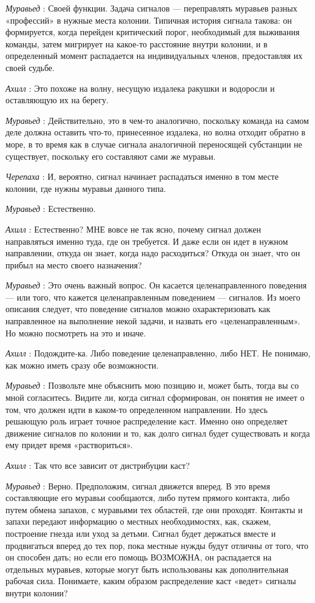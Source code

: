 \documentclass[../main.tex]{subfiles}
\begin{document}
\begin{dialogue}
\emph{Муравьед} : Своей функции. Задача сигналов --- переправлять муравьев разных «профессий» в нужные места колонии. Типичная история сигнала такова: он формируется, когда перейден критический порог, необходимый для выживания команды, затем мигрирует на какое-то расстояние внутри колонии, и в определенный момент распадается на индивидуальных членов, предоставляя их своей судьбе.

\emph{Ахилл} : Это похоже на волну, несущую издалека ракушки и водоросли и оставляющую их на берегу.

\emph{Муравьед} : Действительно, это в чем-то аналогично, поскольку команда на самом деле должна оставить что-то, принесенное издалека, но волна отходит обратно в море, в то время как в случае сигнала аналогичной переносящей субстанции не существует, поскольку его составляют сами же муравьи.

\emph{Черепаха} : И, вероятно, сигнал начинает распадаться именно в том месте колонии, где нужны муравьи данного типа.

\emph{Муравьед} : Естественно.

\emph{Ахилл} : Естественно? МНЕ вовсе не так ясно, почему сигнал должен направляться именно туда, где он требуется. И даже если он идет в нужном направлении, откуда он знает, когда надо расходиться? Откуда он знает, что он прибыл на место своего назначения?

\emph{Муравьед} : Это очень важный вопрос. Он касается целенаправленного поведения --- или того, что кажется целенаправленным поведением --- сигналов. Из моего описания следует, что поведение сигналов можно охарактеризовать как направленное на выполнение некой задачи, и назвать его «целенаправленным». Но можно посмотреть на это и иначе.

\emph{Ахилл} : Подождите-ка. Либо поведение целенаправленно, либо НЕТ. Не понимаю, как можно иметь сразу обе возможности.

\emph{Муравьед} : Позвольте мне объяснить мою позицию и, может быть, тогда вы со мной согласитесь. Видите ли, когда сигнал сформирован, он понятия не имеет о том, что должен идти в каком-то определенном направлении. Но здесь решающую роль играет точное распределение каст. Именно оно определяет движение сигналов по колонии и то, как долго сигнал будет существовать и когда ему придет время «раствориться».

\emph{Ахилл} : Так что все зависит от дистрибуции каст?

\emph{Муравьед} : Верно. Предположим, сигнал движется вперед. В это время составляющие его муравьи сообщаются, либо путем прямого контакта, либо путем обмена запахов, с муравьями тех областей, где они проходят. Контакты и запахи передают информацию о местных необходимостях, как, скажем, построение гнезда или уход за детьми. Сигнал будет держаться вместе и продвигаться вперед до тех пор, пока местные нужды будут отличны от того, что он способен дать; но если его помощь ВОЗМОЖНА, он распадается на отдельных муравьев, которые могут быть использованы как дополнительная рабочая сила. Понимаете, каким образом распределение каст «ведет» сигналы внутри колонии?


\end{dialogue}
\end{document}
